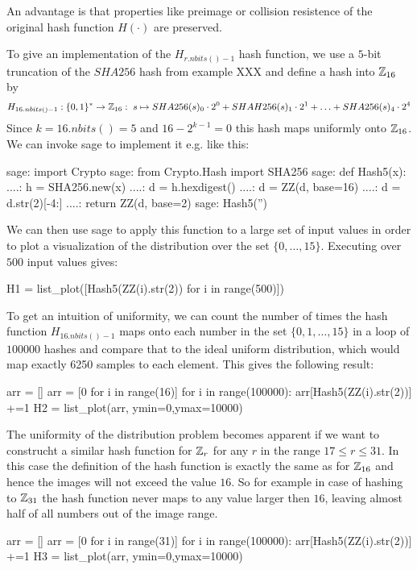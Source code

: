 An advantage is that properties like preimage or collision resistence of the original hash function $H(\cdot)$ are preserved.
\begin{example} To give an implementation of the $H_{r.nbits()-1}$ hash function, we use a $5$-bit truncation of the $SHA256$ hash from example XXX and define a hash into $\mathbb{Z}_{16}$ by
$$
H_{16.nbits()-1}: \{0,1\}^* \to \mathbb{Z}_{16}:\; s\mapsto
SHA256(s)_0\cdot 2^0 + SHAH256(s)_1\cdot 2^1 + \ldots + SHA256(s)_4\cdot 2^4 
$$
Since $k=16.nbits()=5$ and $16-2^{k-1}=0$ this hash maps uniformly onto $\mathbb{Z}_{16}$. We can invoke sage to implement it e.g. like this:
\begin{sagecommandline}
sage: import Crypto 
sage: from Crypto.Hash import SHA256
sage: def Hash5(x):
....:     h = SHA256.new(x)
....:     d = h.hexdigest()
....:     d = ZZ(d, base=16)
....:     d = d.str(2)[-4:]
....:     return ZZ(d, base=2)
sage: Hash5('')
\end{sagecommandline}
We can then use sage to apply this function to a large set of input values in order to plot a visualization of the distribution over the set $\{0,\ldots,15\}$. Executing over $500$ input values gives:
\begin{sagesilent}
H1 = list_plot([Hash5(ZZ(i).str(2)) for i in range(500)])
\end{sagesilent}
\begin{center} 
\end{center}
To get an intuition of uniformity, we can count the number of times the hash function $H_{16.nbits()-1}$ maps onto each number in the set $\{0,1,\ldots,15\}$ in a loop of $100000$ hashes and compare that to the ideal uniform distribution, which would map exactly 6250 samples to each element. This gives the following result:
\begin{sagesilent}
arr = []
arr = [0 for i in range(16)]
for i in range(100000):
    arr[Hash5(ZZ(i).str(2))] +=1
H2 = list_plot(arr, ymin=0,ymax=10000)
\end{sagesilent}
\begin{center} 
\end{center}
The uniformity of the distribution problem becomes apparent if we want to construcht a similar hash function for $\mathbb{Z}_r$ for any $r$ in the range $17\leq r \leq 31$. In this case the definition of the hash function is exactly the same as for $\mathbb{Z}_{16}$ and hence the images will not exceed the value $16$. So for example in case of hashing to $\mathbb{Z}_{31}$ the hash function never maps to any value larger then $16$, leaving almost half of all numbers out of the image range.
\begin{sagesilent}
arr = []
arr = [0 for i in range(31)]
for i in range(100000):
    arr[Hash5(ZZ(i).str(2))] +=1
H3 = list_plot(arr, ymin=0,ymax=10000)
\end{sagesilent}
\begin{center} 
\end{center}
\end{example}
 
